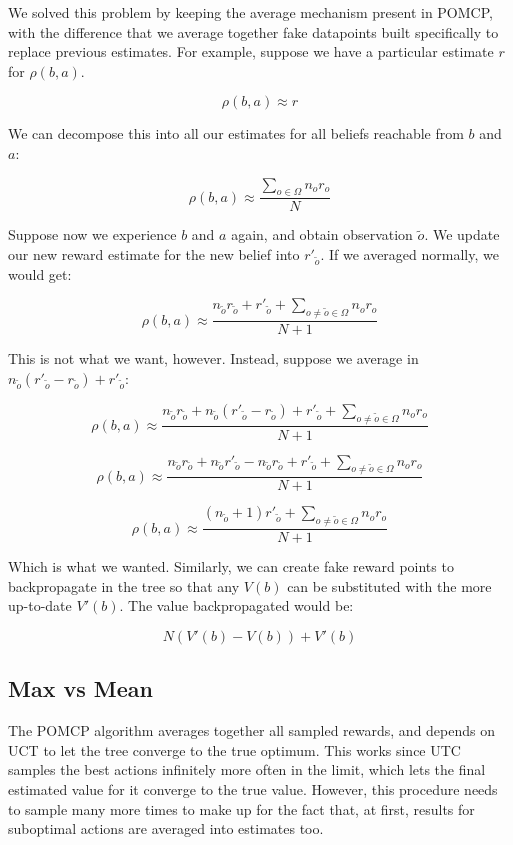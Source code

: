 We solved this problem by keeping the average mechanism present in POMCP, with the difference that
we average together fake datapoints built specifically to replace previous estimates. For
example, suppose we have a particular estimate $r$ for $\rho(b, a)$.

\[ \rho(b,a) \approx r \]

We can decompose this into all our estimates for all beliefs reachable from $b$ and $a$:

\[ \rho(b,a) \approx \frac{\sum_{o\in\Omega} n_o r_o}{N} \]

Suppose now we experience $b$ and $a$ again, and obtain observation $\tilde{o}$. We update our new
reward estimate for the new belief into $r'_{\tilde{o}}$. If we averaged normally, we would get:

\[ \rho(b,a) \approx \frac{ n_{\tilde{o}} r_{\tilde{o}} + r'_{\tilde{o}} +
\sum_{o \neq \tilde{o} \in \Omega} n_o r_o}{N+1} \]

This is not what we want, however. Instead, suppose we average in $n_{\tilde{o}}(r'_{\tilde{o}} -
r_{\tilde{o}}) + r'_{\tilde{o}}$:

\[ \rho(b,a) \approx \frac{ n_{\tilde{o}} r_{\tilde{o}} + n_{\tilde{o}}(r'_{\tilde{o}} -
r_{\tilde{o}}) + r'_{\tilde{o}} +
\sum_{o \neq \tilde{o} \in \Omega} n_o r_o}{N+1} \]

\[ \rho(b,a) \approx \frac{ n_{\tilde{o}} r_{\tilde{o}} + n_{\tilde{o}}r'_{\tilde{o}} -
        n_{\tilde{o}} r_{\tilde{o}} + r'_{\tilde{o}} +
\sum_{o \neq \tilde{o} \in \Omega} n_o r_o}{N+1} \]

\[ \rho(b,a) \approx \frac{ ( n_{\tilde{o}}+1) r'_{\tilde{o}} +
\sum_{o \neq \tilde{o} \in \Omega} n_o r_o}{N+1} \]

Which is what we wanted. Similarly, we can create fake reward points to backpropagate in the tree so
that any $V(b)$ can be substituted with the more up-to-date $V'(b)$. The value backpropagated would be:

\[ N ( V'(b) - V(b) ) + V'(b) \]

\subsection{Max vs Mean}

The POMCP algorithm averages together all sampled rewards, and depends on UCT to let the tree
converge to the true optimum. This works since UTC samples the best actions infinitely more often in
the limit, which lets the final estimated value for it converge to the true value. However, this
procedure needs to sample many more times to make up for the fact that, at first, results for
suboptimal actions are averaged into estimates too.

